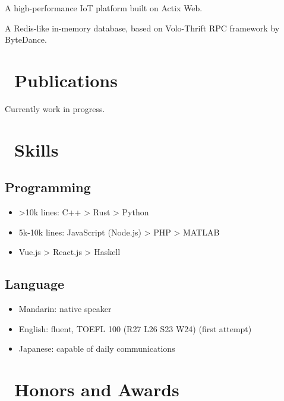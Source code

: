 \documentclass{resume}
\begin{document}
A high-performance IoT platform built on Actix Web.

A Redis-like in-memory database, based on Volo-Thrift RPC framework by ByteDance.

\section{\faBookmarkO\ Publications}
Currently work in progress.

\section{\faCogs\ Skills}
\subsection{\textbf{Programming}}
\begin{itemize}[itemsep=0.5ex]
  \item >10k lines: C++ > Rust > Python
  \item 5k-10k lines: JavaScript (Node.js) > PHP > MATLAB
  \item <5k lines: Java > Vue.js > React.js > Haskell
\end{itemize}
\subsection{\textbf{Language}}
\begin{itemize}[itemsep=0.5ex]
  \item Mandarin: native speaker
  \item English: fluent, TOEFL 100 (R27 L26 S23 W24) (first attempt)
  \item Japanese: capable of daily communications
\end{itemize}

\section{\faHeartO\ Honors and Awards}
\end{document}
